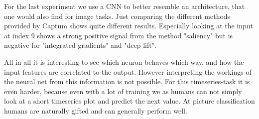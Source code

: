 \documentclass{article}
\begin{document}
For the last experiment we use a CNN to better resemble an architecture, that one would also find for image tasks. Just comparing the different methods provided by Captum shows quite different results. Especially looking at the input at index 9 shows a strong positive signal from the method "saliency" but is negative for "integrated gradients" and "deep lift".


All in all it is interesting to see which neuron behaves which way, and how the input features are correlated to the output. However interpreting the workings of the neural net from this information is not possible. For this timeseries-task it is even harder, because even with a lot of training we as humans can not simply look at a short timeseries plot and predict the next value. At picture classification humans are naturally gifted and can generally perform well.
\end{document}
